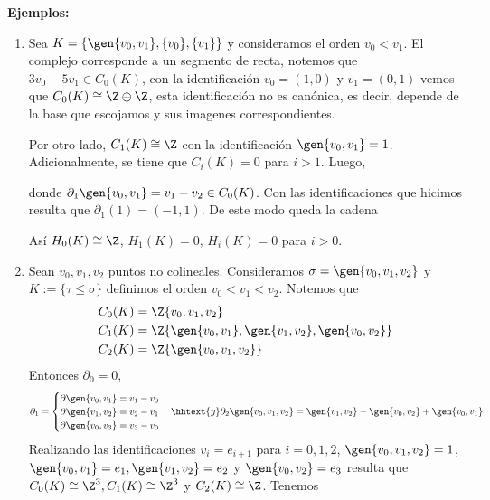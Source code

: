 \documentclass{article}
\begin{document}
\noindent\textbf{Ejemplos:}
\begin{enumerate}
    \item Sea $K=\{\gen{v_{0},v_{1}},\{v_{0}\},\{v_{1}\}\}$ y consideramos el 
    orden $v_{0}<v_{1}$. El complejo corresponde a un segmento de recta, notemos que 
    $3v_{0}-5v_{1}\in C_{0}(K)$, con la identificación $v_{0}=(1,0)$ y $v_{1}=(0,1)$ vemos que 
    $C_{0}(K)\cong\Z\oplus\Z$, esta identificación no es canónica, es decir, depende de la base 
    que escojamos y sus imagenes correspondientes.

    \vspace{2mm}
    \noindent Por otro lado, $C_{1}(K)\cong\Z$ con la identificación $\gen{v_{0},v_{1}}=1$. 
    Adicionalmente, se tiene que $C_{i}(K)=0$ para $i>1$. Luego,

    \vspace{2mm}
    \centerline{
    }
    \vspace{2mm}
    \noindent donde $\partial_{1}\gen{v_{0},v_{1}}=v_{1}-v_{2}\in C_{0}(K)$. Con las 
    identificaciones que hicimos resulta que $\partial_{1}(1)=(-1,1)$. De este modo queda la 
    cadena

    \vspace{2mm}
    \centerline{
    }
    \vspace{2mm}
    \noindent Así $H_{0}(K)\cong\Z$, $H_{1}(K)=0$, $H_{i}(K)=0$ para $i>0$.

    \item Sean $v_{0},v_{1},v_{2}$ puntos no colineales. Consideramos $\sigma=\gen
    {v_{0},v_{1},v_{2}}$ y $K:=\{\tau\leq\sigma\}$ definimos el orden $v_{0}<v_{1}<v_{2}$. Notemos
    que
    \begin{align*}
        C_{0}(K) &= \Z\{v_{0},v_{1},v_{2}\} \\
        C_{1}(K) &= \Z\{\gen{v_{0},v_{1}},\gen{v_{1},v_{2}},\gen{v_{0},v_{2}}\} \\
        C_{2}(K) &= \Z\{\gen{v_{0},v_{1},v_{2}}\}
    \end{align*}
    Entonces $\partial_{0}=0$,
    \begin{equation*}
        \partial_{1}=\begin{cases}
            \partial\gen{v_{0},v_{1}}=v_{1}-v_{0} \\
            \partial\gen{v_{1},v_{2}}=v_{2}-v_{1} \\
            \partial\gen{v_{0},v_{3}}=v_{3}-v_{0}
        \end{cases}\hhtext{y}
        \partial_{2}\gen{v_{0},v_{1},v_{2}}=\gen{v_{1},v_{2}}-\gen{v_{0},v_{2}}+\gen{v_{0},v_{1}}
    \end{equation*}
    Realizando las identificaciones $v_{i}=e_{i+1}$ para $i=0,1,2$, $\gen{v_{0},v_{1},v_{2}}=1$,
    $\gen{v_{0},v_{1}}=e_{1},\gen{v_{1},v_{2}}=e_{2}$ y $\gen{v_{0},v_{2}}=e_{3}$ resulta que
    $C_{0}(K)\cong\Z^{3},C_{1}(K)\cong\Z^{3}$ y $C_{2}(K)\cong\Z$. Tenemos
    

\end{enumerate}
\end{document}
